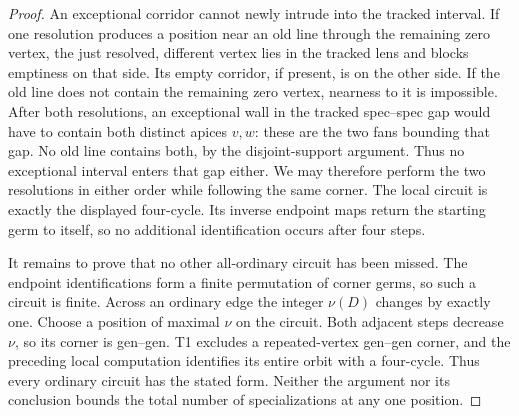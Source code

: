 \documentclass[11pt,a4paper]{article}
\begin{document}
\begin{proof}
An exceptional corridor cannot newly intrude into the tracked interval.
If one resolution produces a position near an old line through the
remaining zero vertex, the just resolved, different vertex lies in the
tracked lens and blocks emptiness on that side. Its empty corridor, if
present, is on the other side. If the old line does not contain the
remaining zero vertex, nearness to it is impossible. After both
resolutions, an exceptional wall in the tracked spec--spec gap would
have to contain both distinct apices $v,w$: these are the two fans
bounding that gap. No old line contains both, by the disjoint-support
argument. Thus no exceptional interval enters that gap either.
We may therefore perform the two resolutions in either order while
following the same corner. The local circuit is exactly the displayed
four-cycle. Its inverse endpoint maps return the starting germ to
itself, so no additional identification occurs after four steps.

It remains to prove that no other all-ordinary circuit has been missed.
The endpoint identifications form a finite permutation of corner germs,
so such a circuit is finite. Across an ordinary edge the integer
$\nu(D)$ changes by exactly one. Choose a position of maximal $\nu$
on the circuit. Both adjacent steps decrease $\nu$, so its corner is
gen--gen. T1 excludes a repeated-vertex gen--gen corner, and the preceding
local computation identifies its entire orbit with a four-cycle.
Thus every ordinary circuit has the stated form. Neither the argument
nor its conclusion bounds the total number of specializations at any
one position.
\end{proof}
\end{document}
